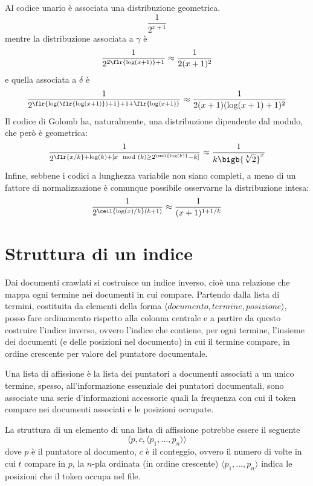 Al codice unario è associata una distribuzione geometrica.
\begin{equation*}
    \frac{1}{2^{x + 1}}
\end{equation*}
mentre la distribuzione associata a $\gamma$ è
\begin{equation*}
    \frac{1}{2^{2\flr{\log(x + 1)} + 1}} \approx \frac{1}{2(x + 1)^2}
\end{equation*}
e quella associata a $\delta$ è
\begin{equation*}
    \frac{1}{2^{\flr{\log(\flr{\log(x + 1)}) + 1} + 1 + \flr{\log(x + 1)}}} \approx \frac{1}{2(x + 1)(\log(x + 1) + 1)^2}
\end{equation*}
Il codice di Golomb ha, naturalmente, una distribuzione dipendente dal modulo, che però è geometrica:
\begin{equation*}
    \frac{1}{2^{\flr{x / k} + \log(k) + [x\mod(k) \geq 2^{\ceil{\log(k)}} - k]}} \approx \frac{1}{k\bigb{\sqrt[k]{2}}^x}
\end{equation*}
Infine, sebbene i codici a lunghezza variabile non siano completi, a meno di un fattore di normalizzazione è comunque possibile osservarne la distribuzione intesa:
\begin{equation*}
    \frac{1}{2^{\ceil{\log(x) / k}(k + 1)}} \approx \frac{1}{(x + 1)^{1 + 1/k}}
\end{equation*}
\section{Struttura di un indice}
Dai documenti crawlati si costruisce un indice inverso, cioè una relazione che mappa ogni termine nei documenti in cui compare. Partendo dalla lista di termini, costituita da elementi della forma $\langle documento, termine, posizione \rangle$, posso fare ordinamento rispetto alla colonna centrale e a partire da questo costruire l'indice inverso, ovvero l'indice che contiene, per ogni termine, l'insieme dei documenti (e delle posizioni nel documento) in cui il termine compare, in ordine crescente per valore del puntatore documentale.

Una lista di affissione è la lista dei puntatori a documenti associati a un unico termine, spesso, all'informazione essenziale dei puntatori documentali, sono associate una serie d'informazioni accessorie quali la frequenza con cui il token compare nei documenti associati e le posizioni occupate.

La struttura di un elemento di una lista di affissione potrebbe essere il seguente
\begin{equation*}
    \langle p, c, \langle p_1, \dots, p_n \rangle \rangle
\end{equation*}
dove $p$ è il puntatore al documento, $c$ è il conteggio, ovvero il numero di volte in cui $t$ compare in $p$, la $n$-pla ordinata (in ordine crescente) $\langle p_1, \dots, p_n \rangle$ indica le posizioni che il token occupa nel file.
